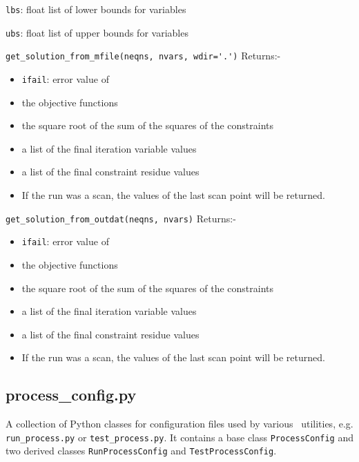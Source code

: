 \begin{description}
  \texttt{lbs}: float list of lower bounds for variables

  \texttt{ubs}: float list of upper bounds for variables

\item{\verb|get_solution_from_mfile(neqns, nvars, wdir='.')|} Returns:-

\begin{itemize}
\item \texttt{ifail}: error value of \process
\item the objective functions
\item the square root of the sum of the squares of the constraints
\item a list of the final iteration variable values
\item a list of the final constraint residue values
\item If the run was a scan, the values of the last scan point will be returned.
\end{itemize}

\item{\verb|get_solution_from_outdat(neqns, nvars)|} Returns:-

\begin{itemize}
\item \texttt{ifail}: error value of \process
\item the objective functions
\item the square root of the sum of the squares of the constraints
\item a list of the final iteration variable values
\item a list of the final constraint residue values
\item If the run was a scan, the values of the last scan point will be returned.
\end{itemize}

\end{description}

\subsection{process\_config.py}

A collection of Python classes for configuration files used by various
\process\ utilities, e.g. \texttt{run\_process.py} or
\texttt{test\_process.py}. It contains a base class \texttt{ProcessConfig} and
two derived classes \texttt{RunProcessConfig} and \texttt{TestProcessConfig}.

